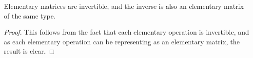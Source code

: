 
\begin{proposition}\label{prop:elementaryinvertible}
    Elementary matrices are invertible, and the inverse is also an elementary matrix of the same type.
\end{proposition}
\begin{proof}
    This follows from the fact that each elementary operation is invertible, and as each elementary operation can be representing as an elementary matrix, the result is clear.
\end{proof}
